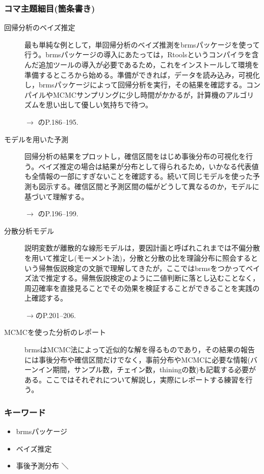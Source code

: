 \subsubsection{コマ主題細目(箇条書き)}
\begin{description}
\item[回帰分析のベイズ推定]最も単純な例として，単回帰分析のベイズ推測をbrmsパッケージを使って行う。brmsパッケージの導入にあたっては，Rtoolsというコンパイラを含んだ追加ツールの導入が必要であるため，これをインストールして環境を準備するところから始める。準備ができれば，データを読み込み，可視化し，brmsパッケージによって回帰分析を実行，その結果を確認する。コンパイルやMCMCサンプリングに少し時間がかかるが，計算機のアルゴリズムを思い出して優しい気持ちで待つ。
\begin{flushright}
    $\to$ \citet{馬場201907}のP.186--195.
\end{flushright}

\item[モデルを用いた予測]回帰分析の結果をプロットし，確信区間をはじめ事後分布の可視化を行う。ベイズ推定の場合は結果が分布として得られるため，いかなる代表値も全情報の一部にすぎないことを確認する。続いて同じモデルを使った予測も図示する。確信区間と予測区間の幅がどうして異なるのか，モデルに基づいて理解する。
\begin{flushright}
    $\to$ \citet{馬場201907}のP.196--199.
\end{flushright}

\item[分散分析モデル]説明変数が離散的な線形モデルは，要因計画と呼ばれこれまでは不偏分散を用いて推定し(モーメント法)，分散と分散の比を理論分布に照会するという帰無仮説検定の文脈で理解してきたが，ここではbrmsをつかってベイズ法で推定する。帰無仮説検定のように二値判断に落とし込むことなく，周辺確率を直接見ることでその効果を検証することができることを実践の上確認する。
\begin{flushright}
    $\to$\citet{馬場201907}のP.201--206.
\end{flushright}

\item[MCMCを使った分析のレポート]brmsはMCMC法によって近似的な解を得るものであり，その結果の報告には事後分布や確信区間だけでなく，事前分布やMCMCに必要な情報(バーンイン期間，サンプル数，チェイン数，thiningの数)も記載する必要がある。ここではそれぞれについて解説し，実際にレポートする練習を行う。

\end{description}
\subsubsection{キーワード}
\begin{itemize}
\item brmsパッケージ
\item ベイズ推定
\item 事後予測分布
＼\end{itemize}
